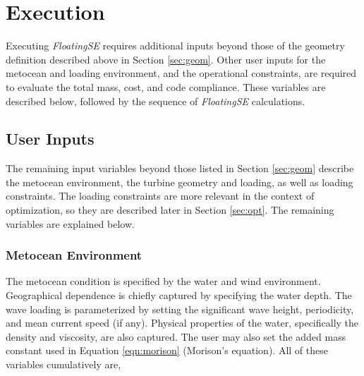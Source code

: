 \chapter{Execution}
\label{sec:exec}
Executing \textit{FloatingSE} requires additional inputs beyond those of
the geometry definition described above in Section \ref{sec:geom}.
Other user inputs for the metocean and loading environment, and the
operational constraints, are required to evaluate the total mass, cost,
and code compliance.  These variables are described below, followed by
the sequence of \textit{FloatingSE} calculations.

\section{User Inputs}
The remaining input variables beyond those listed in Section
\ref{sec:geom} describe the metocean environment, the turbine geometry
and loading, as well as loading constraints.  The loading constraints
are more relevant in the context of optimization, so they are described
later in Section \ref{sec:opt}.  The remaining variables are explained
below.

\subsection{Metocean Environment}
The metocean condition is specified by the water and wind environment.
Geographical dependence is chiefly captured by specifying the water
depth.  The wave loading is parameterized by setting the significant
wave height, periodicity, and mean current speed (if any).  Physical
properties of the water, specifically the density and viscosity, are
also captured.  The user may also set the added mass constant used in
Equation \ref{eqn:morison} (Morison's equation).  All of these variables
cumulatively are,


